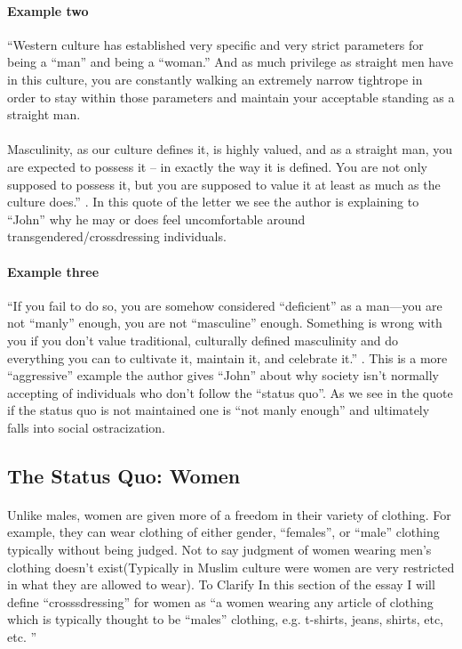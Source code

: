 \paragraph{Example two}
``Western culture has established very specific and very strict parameters for
being a ``man'' and being a ``woman.'' And as much privilege as straight men
have in this culture, you are constantly walking an extremely narrow tightrope
in order to stay within those parameters and maintain your acceptable standing
as a straight man. \\~\\ Masculinity, as our culture defines it, is highly
valued, and as a straight man, you are expected to possess it – in exactly the
way it is defined. You are not only supposed to possess it, but you are supposed
to value it at least as much as the culture does.'' \cite[p.~1]{WDTMU} . In this
quote of the letter we see the author is explaining to ``John'' why he may or
does feel uncomfortable around transgendered/crossdressing individuals.
\par

\paragraph{Example three}
``If you fail to do so, you are somehow considered ``deficient'' as a man---you
are not ``manly'' enough, you are not ``masculine'' enough. Something is wrong
with you if you don’t value traditional, culturally defined masculinity and do
everything you can to cultivate it, maintain it, and celebrate it.''
\cite[p.~1]{WDTMU} . This is a more ``aggressive'' example the author gives
``John'' about why society isn't normally accepting of individuals who don't
follow the ``status quo''. As we see in the quote if the status quo is not
maintained one is ``not manly enough'' and ultimately falls into social
ostracization.
\par

\subsection{The Status Quo: Women}
\paragraph{}
Unlike males, women are given more of a freedom in their variety of clothing.
For example, they can wear clothing of either gender, ``females'', or ``male''
clothing typically without being judged. Not to say judgment of women wearing
men's clothing doesn't exist(Typically in Muslim culture were women are very
restricted in what they are allowed to wear). To Clarify In this section of the
essay I will define ``crosssdressing'' for women as ``a women wearing any
article of clothing which is typically thought to be ``males'' clothing, e.g.
t-shirts, jeans, shirts, etc, etc. ''
\par

